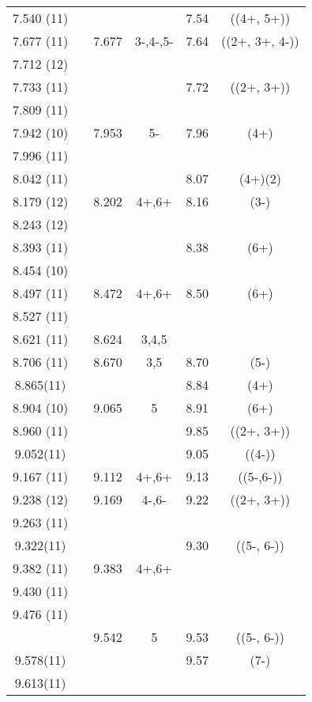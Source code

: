 \begin{center}
\begin{longtable}{cc cc cc}
  7.540 (11)    &   &   &   & 7.54  & ((4+, 5+))  \\
  7.677 (11)    &   & 7.677 & 3-,4-,5-  & 7.64  & ((2+, 3+, 4-))  \\
  7.712 (12)    &   &   &   &   &   \\
  7.733 (11)    &   &   &   & 7.72  & ((2+, 3+))  \\
  7.809 (11)    &   &   &   &   &   \\
  7.942 (10)    &   & 7.953 & 5-  & 7.96  & (4+)  \\
  7.996 (11)    &   &   &   &   &   \\
  8.042 (11)    &   &   &   & 8.07  & (4+)(2) \\
  8.179 (12)    &   & 8.202 & 4+,6+ & 8.16  & (3-)  \\
  8.243 (12)    &   &   &   &   &   \\
  8.393 (11)    &   &   &   & 8.38  & (6+)  \\
  8.454 (10)    &   &   &   &   &   \\
  8.497 (11)    &   & 8.472 & 4+,6+ & 8.50  & (6+)  \\
  8.527 (11)    &   &   &   &   &   \\
  8.621 (11)    &   & 8.624 & 3,4,5 &   &   \\
  8.706 (11)    &   & 8.670 & 3,5 & 8.70  & (5-)  \\
   8.865(11)    &   &   &   & 8.84  & (4+)  \\
  8.904 (10)    &   & 9.065 & 5 & 8.91  & (6+)  \\
  8.960 (11)    &   &   &   & 9.85  & ((2+, 3+))  \\
   9.052(11)    &   &   &   & 9.05  & ((4-))  \\
  9.167 (11)    &   & 9.112 & 4+,6+ & 9.13  & ((5-,6-)) \\
  9.238 (12)    &   & 9.169 & 4-,6- & 9.22  & ((2+, 3+))  \\
  9.263 (11)    &   &   &   &   &   \\
   9.322(11)    &   &   &   & 9.30  & ((5-, 6-))  \\
  9.382 (11)    &   & 9.383 & 4+,6+ &   &   \\
  9.430 (11)    &   &   &   &   &   \\
  9.476 (11)    &   &   &   &   &   \\
  &   & 9.542 & 5 & 9.53  & ((5-, 6-))  \\
   9.578(11)    &   &   &   & 9.57  & (7-)  \\
   9.613(11)    &   &   &   &   &   \\

\end{longtable}
\end{center}
